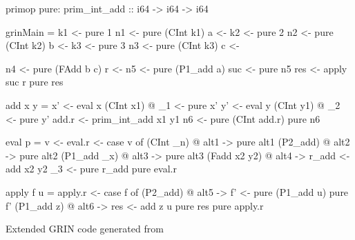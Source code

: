 \documentclass[main.tex]{subfiles}
\begin{document}
  \hspace{-0.5cm}
  \begin{codeFloat}
    \begin{minipage}{0.48\textwidth}
      \begin{haskell}
        primop pure:
          prim_int_add :: i64 -> i64 -> i64

        grinMain =
          k1 <- pure 1
          n1 <- pure (CInt k1)
          a  <- %
          k2 <- pure 2
          n2 <- pure (CInt k2)
          b  <- %
          k3 <- pure 3
          n3 <- pure (CInt k3)
          c  <- %

          n4  <- pure (FAdd b c)
          r   <- %
          n5  <- pure (P1_add a)
          suc <- pure n5
          res <- apply suc r
          pure res

        add x y =
          x' <- eval x
          (CInt x1) @ _1 <- pure x'
          y' <- eval y
          (CInt y1) @ _2 <- pure y'
          add.r <- prim_int_add x1 y1
          n6 <- pure (CInt add.r)
          pure n6
      \end{haskell}
    \end{minipage}
    \hfill
    \begin{minipage}{0.44\textwidth}
      \begin{haskellNum}{30}
       eval p =
         v <- %
         eval.r <- case v of
           (CInt _n) @ alt1 ->
              pure alt1
           (P2_add) @ alt2 ->
              pure alt2
           (P1_add _x) @ alt3 ->
              pure alt3
           (Fadd x2 y2) @ alt4 ->
             r_add <- add x2 y2
             _3 <- %
             pure r_add
         pure eval.r

       apply f u =
         apply.r <- case f of
           (P2_add) @ alt5 ->
             f' <- pure (P1_add u)
             pure f'
           (P1_add z) @ alt6 ->
             res <- add z u
             pure res
         pure apply.r
      \end{haskellNum}
    \end{minipage}
    \caption{Extended GRIN code generated from }
    \label{code:grin-add-es}
  \end{codeFloat}
\end{document}
